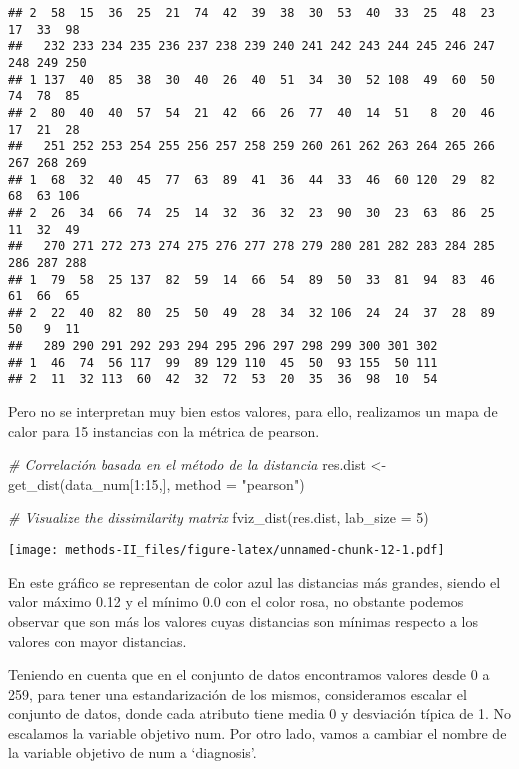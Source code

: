 \documentclass[
]{article}
\newenvironment{Shaded}{\begin{snugshade}}{\end{snugshade}}
\newcommand{\AttributeTok}[1]{\textcolor[rgb]{0.77,0.63,0.00}{#1}}
\newcommand{\CommentTok}[1]{\textcolor[rgb]{0.56,0.35,0.01}{\textit{#1}}}
\newcommand{\DecValTok}[1]{\textcolor[rgb]{0.00,0.00,0.81}{#1}}
\newcommand{\FunctionTok}[1]{\textcolor[rgb]{0.00,0.00,0.00}{#1}}
\newcommand{\NormalTok}[1]{#1}
\newcommand{\OtherTok}[1]{\textcolor[rgb]{0.56,0.35,0.01}{#1}}
\newcommand{\SpecialCharTok}[1]{\textcolor[rgb]{0.00,0.00,0.00}{#1}}
\newcommand{\StringTok}[1]{\textcolor[rgb]{0.31,0.60,0.02}{#1}}
\begin{document}
\begin{verbatim}
## 2  58  15  36  25  21  74  42  39  38  30  53  40  33  25  48  23  17  33  98
##   232 233 234 235 236 237 238 239 240 241 242 243 244 245 246 247 248 249 250
## 1 137  40  85  38  30  40  26  40  51  34  30  52 108  49  60  50  74  78  85
## 2  80  40  40  57  54  21  42  66  26  77  40  14  51   8  20  46  17  21  28
##   251 252 253 254 255 256 257 258 259 260 261 262 263 264 265 266 267 268 269
## 1  68  32  40  45  77  63  89  41  36  44  33  46  60 120  29  82  68  63 106
## 2  26  34  66  74  25  14  32  36  32  23  90  30  23  63  86  25  11  32  49
##   270 271 272 273 274 275 276 277 278 279 280 281 282 283 284 285 286 287 288
## 1  79  58  25 137  82  59  14  66  54  89  50  33  81  94  83  46  61  66  65
## 2  22  40  82  80  25  50  49  28  34  32 106  24  24  37  28  89  50   9  11
##   289 290 291 292 293 294 295 296 297 298 299 300 301 302
## 1  46  74  56 117  99  89 129 110  45  50  93 155  50 111
## 2  11  32 113  60  42  32  72  53  20  35  36  98  10  54
\end{verbatim}

Pero no se interpretan muy bien estos valores, para ello, realizamos un
mapa de calor para 15 instancias con la métrica de pearson.

\begin{Shaded}
\begin{Highlighting}[]
\CommentTok{\# Correlación basada en el método de la distancia}
\NormalTok{res.dist }\OtherTok{\textless{}{-}} \FunctionTok{get\_dist}\NormalTok{(data\_num[}\DecValTok{1}\SpecialCharTok{:}\DecValTok{15}\NormalTok{,], }\AttributeTok{method =} \StringTok{"pearson"}\NormalTok{)}

\CommentTok{\# Visualize the dissimilarity matrix}
\FunctionTok{fviz\_dist}\NormalTok{(res.dist, }\AttributeTok{lab\_size =} \DecValTok{5}\NormalTok{)}
\end{Highlighting}
\end{Shaded}

\texttt{[image: methods-II\_files/figure-latex/unnamed-chunk-12-1.pdf]}

En este gráfico se representan de color azul las distancias más grandes,
siendo el valor máximo 0.12 y el mínimo 0.0 con el color rosa, no
obstante podemos observar que son más los valores cuyas distancias son
mínimas respecto a los valores con mayor distancias.

Teniendo en cuenta que en el conjunto de datos encontramos valores desde
0 a 259, para tener una estandarización de los mismos, consideramos
escalar el conjunto de datos, donde cada atributo tiene media 0 y
desviación típica de 1. No escalamos la variable objetivo num. Por otro
lado, vamos a cambiar el nombre de la variable objetivo de num a
`diagnosis'.
\end{document}
